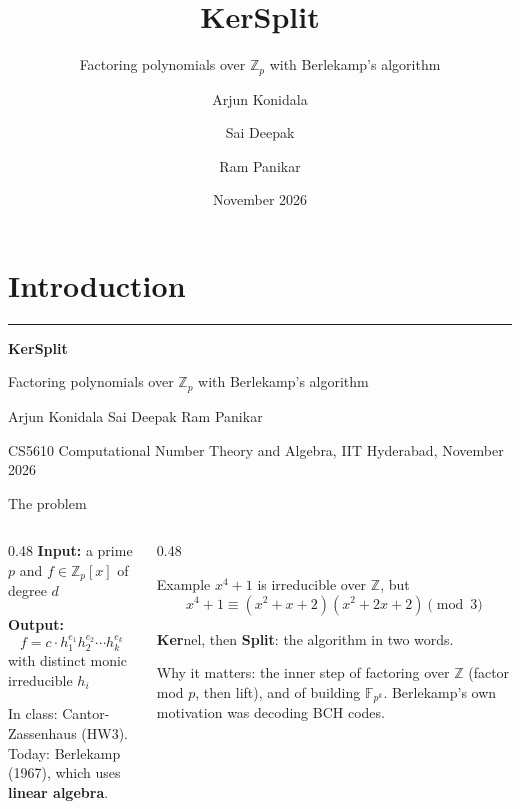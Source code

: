 \documentclass[aspectratio=169,11pt]{beamer}
\title{KerSplit}
\subtitle{Factoring polynomials over $\mathbb{Z}_p$ with Berlekamp's algorithm}
\author{Arjun Konidala \and Sai Deepak \and Ram Panikar}
\institute{CS5610 Computational Number Theory and Algebra, IIT Hyderabad}
\date{November 2026}
\newcommand{\Zpx}{\mathbb{Z}_p[x]}
\newcommand{\aside}[1]{{\color{muted}\small #1}}
\begin{document}
\section{Introduction}

\begin{frame}[plain]
  \vfill
  {\color{customblue}\rule{3em}{4pt}}\par\vspace{0.8em}
  {\fontsize{40}{44}\selectfont\bfseries\color{customblue} KerSplit}\par\vspace{0.4em}
  {\Large Factoring polynomials over $\mathbb{Z}_p$ with Berlekamp's algorithm}\par\vspace{1.6em}
  {\color{ink} Arjun Konidala \quad\textbullet\quad Sai Deepak \quad\textbullet\quad Ram Panikar}\par\vspace{0.3em}
  {\color{muted}\small CS5610 Computational Number Theory and Algebra, IIT Hyderabad, November 2026}
  \vfill
\end{frame}

\begin{frame}{The problem}
  \begin{columns}[T]
    \begin{column}{0.48\textwidth}
      \textbf{Input:} a prime $p$ and $f \in \Zpx$ of degree $d$\par\medskip
      \textbf{Output:}
      \[ f = c \cdot h_1^{e_1} h_2^{e_2} \cdots h_k^{e_k} \]
      with distinct monic irreducible $h_i$\par\bigskip
      \aside{In class: Cantor-Zassenhaus (HW3).\\ Today: Berlekamp (1967), which uses \textbf{linear algebra}.}
    \end{column}
    \begin{column}{0.48\textwidth}
      \begin{block}{Example}
        $x^4 + 1$ is irreducible over $\mathbb{Z}$, but
        \[ x^4 + 1 \equiv (x^2 + x + 2)(x^2 + 2x + 2) \pmod 3 \]
      \end{block}
      \medskip
      \aside{\textbf{Ker}nel, then \textbf{Split}: the algorithm in two words.}\par\medskip
      \aside{Why it matters: the inner step of factoring over $\mathbb{Z}$ (factor mod $p$, then lift), and of building $\mathbb{F}_{p^k}$. Berlekamp's own motivation was decoding BCH codes.}
    \end{column}
  \end{columns}
\end{frame}
\end{document}
